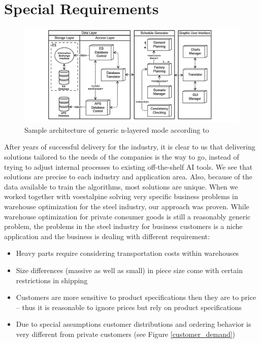 \documentclass[fleqn,10pt]{SelfArx} %
\begin{document}
\section{Special Requirements}

\begin{figure}[ht]\centering %
\includegraphics[width=\linewidth]{architecture}
\caption{Sample architecture of generic n-layered mode according to \cite{vidoni2015}}
\label{fig:view}
\end{figure}

After years of successful delivery for the industry, it is clear to us that delivering solutions tailored to the needs of the companies is the way to go, instead of trying to adjust internal processes to existing off-the-shelf AI tools. We see that solutions are precise to each industry and application area. Also, because of the data available to train the algorithms, most solutions are unique. When we worked together with voestalpine solving very specific business problems in warehouse optimization for the steel industry, our approach was proven. 
While warehouse optimization for private consumer goods is still a reasonably generic problem, the problems in the steel industry for business customers is a niche application and the business is dealing with different requirement:
\begin{itemize}
  \item Heavy parts require considering transportation costs within warehouses
  \item Size differences (massive as well as small) in piece size come with certain restrictions in shipping
  \item Customers are more sensitive to product specifications then they are to price – thus it is reasonable to ignore prices but rely on product specifications
  \item Due to special assumptions customer distributions and ordering behavior is very different from private customers (see Figure \ref{customer_demand})
\end{itemize}
\end{document}
